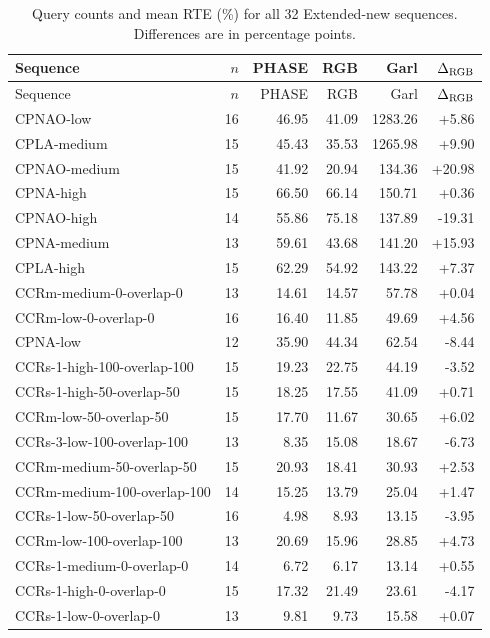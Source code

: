\begin{longtable}{@{}p{6.0cm}rrrrr@{}}
\caption{Query counts and mean RTE (\%) for all 32 Extended-new sequences. Differences are in percentage points. }\label{tab:sequence-full}\\
\toprule Sequence & $n$ & PHASE & RGB & Garl & $\Delta_{\rm RGB}$\\\midrule\endfirsthead
\toprule Sequence & $n$ & PHASE & RGB & Garl & $\Delta_{\rm RGB}$\\\midrule\endhead
\bottomrule\endfoot
CPNAO-low & 16 & 46.95 & 41.09 & 1283.26 & +5.86\\
CPLA-medium & 15 & 45.43 & 35.53 & 1265.98 & +9.90\\
CPNAO-medium & 15 & 41.92 & 20.94 & 134.36 & +20.98\\
CPNA-high & 15 & 66.50 & 66.14 & 150.71 & +0.36\\
CPNAO-high & 14 & 55.86 & 75.18 & 137.89 & -19.31\\
CPNA-medium & 13 & 59.61 & 43.68 & 141.20 & +15.93\\
CPLA-high & 15 & 62.29 & 54.92 & 143.22 & +7.37\\
CCRm-medium-0-overlap-0 & 13 & 14.61 & 14.57 & 57.78 & +0.04\\
CCRm-low-0-overlap-0 & 16 & 16.40 & 11.85 & 49.69 & +4.56\\
CPNA-low & 12 & 35.90 & 44.34 & 62.54 & -8.44\\
CCRs-1-high-100-overlap-100 & 15 & 19.23 & 22.75 & 44.19 & -3.52\\
CCRs-1-high-50-overlap-50 & 15 & 18.25 & 17.55 & 41.09 & +0.71\\
CCRm-low-50-overlap-50 & 15 & 17.70 & 11.67 & 30.65 & +6.02\\
CCRs-3-low-100-overlap-100 & 13 & 8.35 & 15.08 & 18.67 & -6.73\\
CCRm-medium-50-overlap-50 & 15 & 20.93 & 18.41 & 30.93 & +2.53\\
CCRm-medium-100-overlap-100 & 14 & 15.25 & 13.79 & 25.04 & +1.47\\
CCRs-1-low-50-overlap-50 & 16 & 4.98 & 8.93 & 13.15 & -3.95\\
CCRm-low-100-overlap-100 & 13 & 20.69 & 15.96 & 28.85 & +4.73\\
CCRs-1-medium-0-overlap-0 & 14 & 6.72 & 6.17 & 13.14 & +0.55\\
CCRs-1-high-0-overlap-0 & 15 & 17.32 & 21.49 & 23.61 & -4.17\\
CCRs-1-low-0-overlap-0 & 13 & 9.81 & 9.73 & 15.58 & +0.07\\

\end{longtable}
